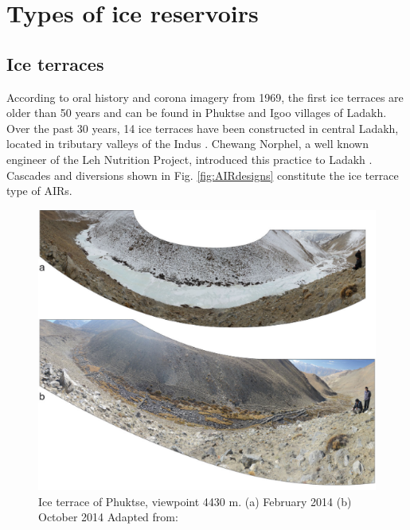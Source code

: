 \section{Types of ice reservoirs}

\subsection{Ice terraces}

According to oral history and corona imagery from 1969, the first ice terraces are older than 50 years and can
be found in Phuktse and Igoo villages of Ladakh. Over the past 30 years, 14 ice terraces have been constructed in central Ladakh,
located in tributary valleys of the Indus \citep{norphelArtificialGlacierHigh2009,
nusserSociohydrologyArtificialGlaciers2019}. Chewang Norphel, a well known engineer of the Leh Nutrition
Project, introduced this practice to Ladakh \citep{vinceGlacierMan2009}. Cascades and diversions shown in Fig.
\ref{fig:AIRdesigns} constitute the ice terrace type of AIRs.

\begin{figure}[htb]
\centering
\includegraphics[width=\textwidth]{figs/IT_example.png}
\caption{Ice terrace of Phuktse, viewpoint 4430 m. (a) February 2014 (b) October 2014 Adapted from: \cite{nusserSociohydrologyArtificialGlaciers2019}}
\label{fig:ITexample}
\end{figure}

